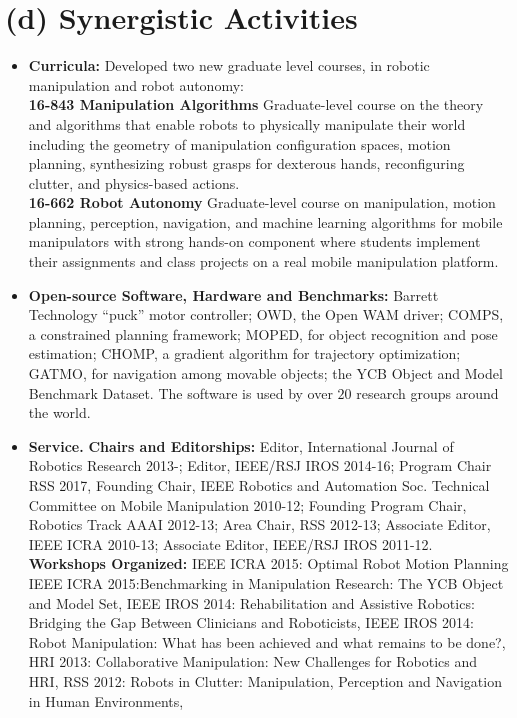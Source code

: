 \documentclass[10pt]{article}
\begin{document}
\section{(d) Synergistic Activities}
\begin{itemize}
\addtolength{\itemsep}{-0.5\baselineskip}
\item \textbf{Curricula:} Developed two new graduate level courses, in robotic manipulation and robot autonomy: \\
\textbf{16-843 Manipulation Algorithms} Graduate-level course on the theory and algorithms that enable robots to physically manipulate their world including the geometry of manipulation configuration spaces, motion planning, synthesizing robust grasps for dexterous hands, reconfiguring clutter, and physics-based actions.\\
\textbf{16-662 Robot Autonomy}
Graduate-level course on manipulation, motion planning, perception, navigation,
and machine learning algorithms for mobile manipulators with strong hands-on component where students implement their assignments and class projects on a real mobile manipulation platform.
\item \textbf{Open-source Software, Hardware and Benchmarks:}
Barrett Technology ``puck'' motor controller; OWD, the Open WAM driver; COMPS, a constrained planning framework; MOPED, for object recognition and pose estimation; CHOMP, a gradient algorithm for trajectory optimization; GATMO, for navigation among movable objects; the YCB Object and Model Benchmark Dataset. The software is used by over $20$ research groups around the world. 
\item \textbf{Service.} \textbf{Chairs and Editorships:}
Editor, International Journal of Robotics Research 2013-;
Editor, IEEE/RSJ IROS 2014-16;
Program Chair RSS 2017,
Founding Chair, IEEE Robotics and Automation Soc. Technical Committee on Mobile Manipulation 2010-12;
Founding Program Chair, Robotics Track AAAI 2012-13;
Area Chair, RSS 2012-13;
Associate Editor, IEEE ICRA 2010-13;
Associate Editor, IEEE/RSJ IROS 2011-12.
\textbf{Workshops Organized:} 
IEEE ICRA 2015: Optimal Robot Motion Planning
IEEE ICRA 2015:Benchmarking in Manipulation Research: The YCB Object and Model Set,
IEEE IROS 2014: Rehabilitation and Assistive Robotics: Bridging the Gap Between Clinicians and Roboticists,
IEEE IROS 2014: Robot Manipulation: What has been achieved and what remains to be done?,
HRI 2013: Collaborative Manipulation: New Challenges for Robotics and HRI,
RSS 2012: Robots in Clutter: Manipulation, Perception and Navigation in Human Environments,

\end{itemize}
\end{document}
